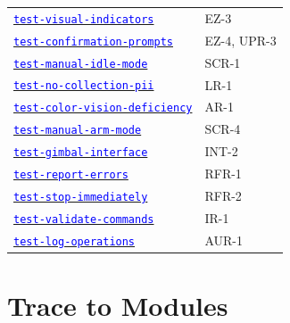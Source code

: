 \documentclass[12pt, titlepage]{article}
\newcommand{\tid}[1]{\hyperlink{tid:#1}{\textcolor{blue}{\texttt{#1}}}}
\begin{document}
\begin{tabularx}{\textwidth}{p{5cm}X}
  \tid{test-visual-indicators}       & EZ-3                     \\
  \tid{test-confirmation-prompts}    & EZ-4, UPR-3              \\
  \tid{test-manual-idle-mode}        & SCR-1                    \\
  \tid{test-no-collection-pii}       & LR-1                     \\
  \tid{test-color-vision-deficiency} & AR-1                     \\
  \tid{test-manual-arm-mode}         & SCR-4                    \\
  \tid{test-gimbal-interface}        & INT-2                    \\
  \tid{test-report-errors}           & RFR-1                    \\
  \tid{test-stop-immediately}        & RFR-2                    \\
  \tid{test-validate-commands}       & IR-1                     \\
  \tid{test-log-operations}          & AUR-1                    \\
  \bottomrule
\end{tabularx}

\section{Trace to Modules}
\end{document}
